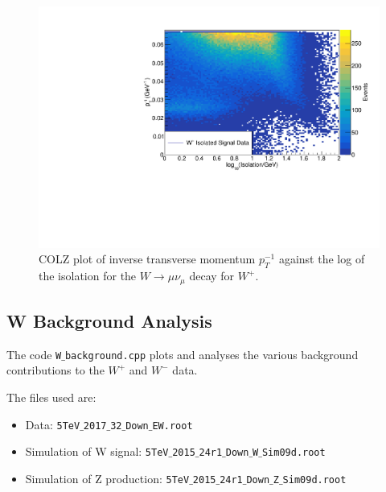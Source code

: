 \documentclass[a4paper]{article}
\begin{document}
\begin{figure}[!h]
    \centering
    \includegraphics[clip, trim = 0cm 0cm 0.3cm 1.3cm, width=\textwidth]{../doc/measurement_doc/W+_isolated_signal_COLZ.pdf}
    \vspace{-4mm}
    \caption{\small COLZ plot of inverse transverse momentum $p_T^{-1}$ against the log of the isolation for the $W \xrightarrow{} \mu \nu_\mu$ decay for $W^+$.}
    \label{fig: COLZ} %
\end{figure}


\subsection{W Background Analysis} \label{sec: W background}

The code \texttt{W$\_$background.cpp} plots and analyses the various background contributions to the $W^+$ and $W^-$ data.

The files used are:
\begin{itemize}
    \item Data: \texttt{5TeV$\_$2017$\_$32$\_$Down$\_$EW.root}
    \item Simulation of W signal: \texttt{5TeV$\_$2015$\_$24r1$\_$Down$\_$W$\_$Sim09d.root}
    \item Simulation of Z production: \texttt{5TeV$\_$2015$\_$24r1$\_$Down$\_$Z$\_$Sim09d.root}
\end{itemize}
\end{document}
